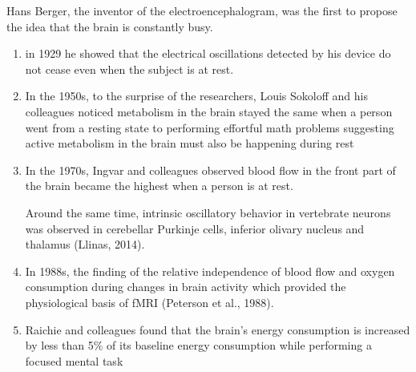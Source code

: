 Hans Berger, the inventor of the electroencephalogram, was the first to propose the idea that the brain is constantly busy. 
\begin{enumerate}
  \item  in 1929 he showed that the electrical oscillations detected by his device do not cease even when the subject is at rest. 


  \item In the 1950s, to the surprise of the researchers, Louis Sokoloff and his
  colleagues noticed metabolism in the brain stayed the same when a person went
  from a resting state to performing effortful math problems suggesting active
  metabolism in the brain must also be happening during rest
  

  \item  In the 1970s, Ingvar and colleagues observed blood flow in the front
  part of the brain became the highest when a person is at rest.
  
  
Around the same time, intrinsic oscillatory behavior in vertebrate neurons was
observed in cerebellar Purkinje cells, inferior olivary nucleus and thalamus (Llinas, 2014).


  \item In 1988s, the finding of the relative independence of blood flow and
  oxygen consumption during changes in brain activity which provided the
  physiological basis of fMRI (Peterson et al., 1988).
  

  \item Raichie and colleagues found that the brain's energy consumption is
  increased by less than 5\% of its baseline energy consumption while performing
  a focused mental task
  

\end{enumerate}
